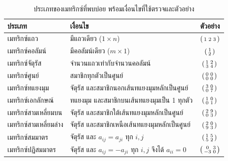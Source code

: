 \begin{table}[H]
\centering
\caption{ประเภทของเมทริกซ์ที่พบบ่อย พร้อมเงื่อนไขที่ใช้ตรวจและตัวอย่าง}
\label{tab:matrix-types}
\renewcommand{\arraystretch}{1.5}
\begin{tabular}{|l|l|c|}
\hline
\textbf{ประเภท} & \textbf{เงื่อนไข} & \textbf{ตัวอย่าง} \\
\hline
เมทริกซ์แถว & มีแถวเดียว ($1 \times n$) & $\begin{psmallmatrix} 1 & 2 & 3 \end{psmallmatrix}$ \\
เมทริกซ์คอลัมน์ & มีคอลัมน์เดียว ($m \times 1$) & $\begin{psmallmatrix} 1 \\ 2 \end{psmallmatrix}$ \\
เมทริกซ์จัตุรัส & จำนวนแถวเท่ากับจำนวนคอลัมน์ & $\begin{psmallmatrix} 1 & 2 \\ 3 & 4 \end{psmallmatrix}$ \\
เมทริกซ์ศูนย์ & สมาชิกทุกตัวเป็นศูนย์ & $\begin{psmallmatrix} 0 & 0 \\ 0 & 0 \end{psmallmatrix}$ \\
เมทริกซ์ทแยงมุม & จัตุรัส และสมาชิกนอกเส้นทแยงมุมหลักเป็นศูนย์ & $\begin{psmallmatrix} 3 & 0 \\ 0 & 7 \end{psmallmatrix}$ \\
เมทริกซ์เอกลักษณ์ & ทแยงมุม และสมาชิกบนเส้นทแยงมุมเป็น 1 ทุกตัว & $\begin{psmallmatrix} 1 & 0 \\ 0 & 1 \end{psmallmatrix}$ \\
เมทริกซ์สามเหลี่ยมบน & จัตุรัส และสมาชิกใต้เส้นทแยงมุมหลักเป็นศูนย์ & $\begin{psmallmatrix} 2 & 9 \\ 0 & 3 \end{psmallmatrix}$ \\
เมทริกซ์สามเหลี่ยมล่าง & จัตุรัส และสมาชิกเหนือเส้นทแยงมุมหลักเป็นศูนย์ & $\begin{psmallmatrix} 2 & 0 \\ 9 & 3 \end{psmallmatrix}$ \\
เมทริกซ์สมมาตร & จัตุรัส และ $a_{ij} = a_{ji}$ ทุก $i, j$ & $\begin{psmallmatrix} 1 & 5 \\ 5 & 2 \end{psmallmatrix}$ \\
เมทริกซ์ปฏิสมมาตร & จัตุรัส และ $a_{ij} = -a_{ji}$ ทุก $i, j$ จึงได้ $a_{ii} = 0$ & $\begin{psmallmatrix} 0 & 3 \\ -3 & 0 \end{psmallmatrix}$ \\
\hline
\end{tabular}
\end{table}

